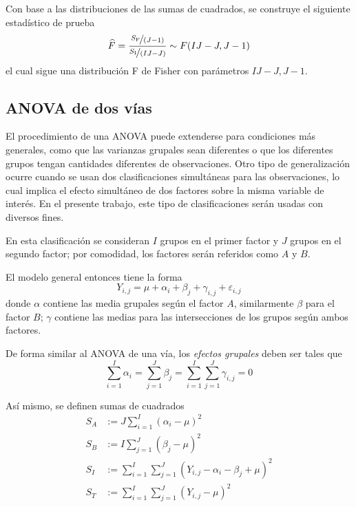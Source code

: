 \documentclass[12pt,letterpaper]{book}
\begin{document}
Con base a las distribuciones de las sumas de cuadrados, se construye el siguiente estadístico de prueba
\begin{equation}
\widehat{F} = \frac{\nicefrac{S_{\text{F}}}{(J - 1)}}{\nicefrac{S_{\text{I}}}{(I J - J)}}
\sim F(I J -J, J-1)
\end{equation}
el cual sigue una distribución F de Fisher con parámetros $I J -J, J-1$.


\subsection{ANOVA de dos vías}
\label{sec:ANOVA2}

El procedimiento de una ANOVA puede extenderse para condiciones más generales, como que las varianzas grupales sean diferentes o que los diferentes grupos tengan cantidades diferentes de observaciones.
%
Otro tipo de generalización ocurre cuando se usan dos clasificaciones simultáneas para las observaciones, lo cual implica el efecto simultáneo de dos factores sobre la misma variable de interés.
%
En el presente trabajo, este tipo de clasificaciones serán usadas con diversos fines.

En esta clasificación se consideran $I$ grupos en el primer factor y $J$ grupos en el segundo factor; por comodidad, los factores serán referidos como $A$ y $B$.

El modelo general entonces tiene la forma
\begin{equation}
Y_{i,j} = \mu + \alpha_i + \beta_j + \gamma_{i,j}  + \varepsilon_{i,j}
\end{equation}
donde $\alpha$ contiene las media grupales según el factor $A$, similarmente $\beta$ para el factor $B$; $\gamma$ contiene las medias para las intersecciones de los grupos según ambos factores.

De forma similar al ANOVA de una vía, los \textit{efectos grupales} deben ser tales que 
\begin{equation}
\sum_{i=1}^I \alpha_i = \sum_{j=1}^J \beta_j = \sum_{i=1}^I \sum_{j=1}^J \gamma_{i,j} = 0
\end{equation}

Así mismo, se definen sumas de cuadrados
\begin{align}
S_A &:= J \sum_{i=1}^I \left( \alpha_i - \mu \right)^2 \\
S_B &:= I \sum_{j=1}^J \left( \beta_j  - \mu \right)^2 \\
S_I &:= \sum_{i=1}^I \sum_{j=1}^J \left( Y_{i,j} - \alpha_i - \beta_j + \mu \right)^2 \\
S_T &:= \sum_{i=1}^I \sum_{j=1}^J \left( Y_{i,j}  - \mu \right)^2 
\end{align}
\end{document}
